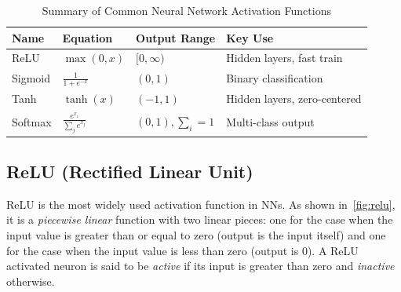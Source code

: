 \documentclass[oneside,11pt,dvipsnames]{book}
\numberwithin{equation}{section}
\theoremstyle{definition}
\theoremstyle{remark}
\newcommand{\sigmoid}[1]{\mathrm{sigmoid}\left(#1\right)}
\begin{document}
\begin{table}
  \centering
  \caption{Summary of Common Neural Network Activation Functions}\label{tab:activation}
  \small
  \begin{tabular}{llll}
    \toprule
    \textbf{Name} & \textbf{Equation} & \textbf{Output Range} & \textbf{Key Use} \\
    \midrule
    ReLU      & $ \max(0, x) $                   & $[0, \infty)$   & Hidden layers, fast train \\    
    Sigmoid   & $ \frac{1}{1 + e^{-x}} $         & $(0, 1)$        & Binary classification \\
    Tanh      & $ \tanh(x) $                     & $(-1, 1)$       & Hidden layers, zero-centered \\
    Softmax   & $ \frac{e^{x_i}}{\sum_j e^{x_j}} $& $(0, 1), \sum_i=1 $ & Multi-class output \\    
    \bottomrule
  \end{tabular}
\end{table}


\subsection{ReLU (Rectified Linear Unit)}\label{sec:relu}

ReLU is the most widely used activation function in NNs.  As shown in~\autoref{fig:relu}, it is a  \emph{piecewise linear} function with two linear pieces: one for the case when the input value is greater than or equal to zero (output is the input itself) and one for the case when the input value is less than zero (output is 0). A ReLU activated neuron is said to be \emph{active} if its input is greater than zero and \emph{inactive} otherwise.
\end{document}
